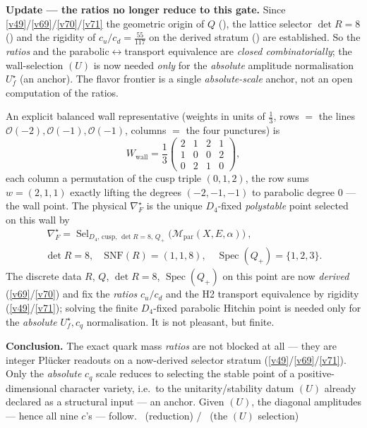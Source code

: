 \begin{keybox}
\noindent\textbf{Update --- the ratios no longer reduce to this gate.} Since \vref{v49}/\vref{v69}/\vref{v70}/\vref{v71} the geometric
origin of $Q$ (), the lattice selector $\det R=8$ ()
and the rigidity of $c_u/c_d=\tfrac{55}{117}$ on the derived stratum () are
established. So the \emph{ratios} and the parabolic$\leftrightarrow$transport equivalence are \emph{closed
combinatorially}; the wall-selection $(U)$ is now needed \emph{only} for the \emph{absolute} amplitude
normalisation $U_f^\star$ (an anchor). The flavor frontier is a single \emph{absolute-scale} anchor, not an
open computation of the ratios.

\begin{keybox}
An explicit balanced wall representative (weights in units of $\tfrac13$, rows $=$ the lines
$\mathcal O(-2),\mathcal O(-1),\mathcal O(-1)$, columns $=$ the four punctures) is
\[
  W_{\mathrm{wall}}=\frac13\begin{pmatrix}2&1&2&1\\1&0&0&2\\0&2&1&0\end{pmatrix},
\]
each column a permutation of the cusp triple $(0,1,2)$, the row sums $w=(2,1,1)$ exactly lifting the
degrees $(-2,-1,-1)$ to parabolic degree $0$ --- the wall point. The physical $\nabla_F^\star$ is the unique
$D_4$-fixed \emph{polystable} point selected on this wall by
\[
\begin{gathered}
  \boxed{\ \nabla_F^\star=\operatorname{Sel}_{D_4,\,\mathrm{cusp},\,\det R=8,\,Q_+}
  \bigl(\mathcal M_{\mathrm{par}}(X,E,\alpha)\bigr)\ },\\[3pt]
  \det R=8,\quad \mathrm{SNF}(R)=(1,1,8),\quad \operatorname{Spec}(Q_+)=\{1,2,3\}.
\end{gathered}
\]
The discrete data $R$, $Q$, $\det R=8$, $\operatorname{Spec}(Q_+)$ on this point are now \emph{derived}
(\vref{v69}/\vref{v70}) and fix the \emph{ratios} $c_u/c_d$ and the H2 transport equivalence by rigidity (\vref{v49}/\vref{v71});
solving the finite $D_4$-fixed parabolic Hitchin point is needed only for the \emph{absolute} $U_f^\star,c_q$
normalisation. It is not pleasant, but finite. 
\end{keybox}
\textbf{Conclusion.} The exact quark mass \emph{ratios} are not blocked at all --- they are integer Plücker
readouts on a now-derived selector stratum (\vref{v49}/\vref{v69}/\vref{v71}). Only the \emph{absolute} $c_q$ scale reduces to
selecting the stable point of a positive-dimensional character variety, i.e.\ to the
unitarity/stability datum $(U)$ already declared as a structural input --- an anchor. Given $(U)$, the diagonal
amplitudes --- hence all nine $c$'s --- follow. \mE\ (reduction) / \mO\ (the $(U)$ selection)
\end{keybox}

